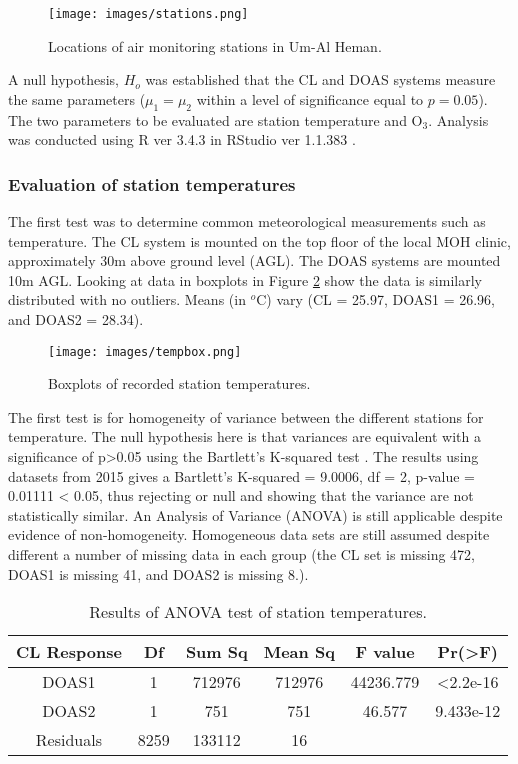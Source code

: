 %
\begin{figure}[H]
\centering
\texttt{[image: images/stations.png]} 
\caption{Locations of air monitoring stations in Um-Al Heman.}
\label{fig:stations}
\end{figure}
%
A null hypothesis, $H_{o}$ was established that the CL and DOAS systems measure the same parameters ($\mu_{1} = \mu_{2}$ within a level of significance equal to $p=0.05$). The two parameters to be evaluated are station temperature and O$_{3}$. Analysis was conducted using R ver 3.4.3 in RStudio ver 1.1.383 \citep{r2013}.

\subsubsection{Evaluation of station temperatures}
 The first test was to determine common meteorological measurements such as temperature.  The CL system is mounted on the top floor of the local MOH clinic, approximately 30m above ground level (AGL). The DOAS systems are mounted 10m AGL. Looking at data in boxplots in Figure \ref{fig:tempbox} show the data is similarly distributed with no outliers. Means (in $^{o}$C)  vary (CL = 25.97, DOAS1 = 26.96, and DOAS2 = 28.34).

%
\begin{figure}[H]
\centering
\texttt{[image: images/tempbox.png]} 
\caption{Boxplots of recorded station temperatures.}
\label{fig:tempbox}
\end{figure}
%

The first test is for homogeneity of variance between the different stations for temperature. The null hypothesis here is that variances are equivalent with a significance of p>0.05 using the Bartlett's K-squared test \citep{Mason2003}. The results using datasets from 2015 gives a Bartlett's K-squared = 9.0006, df = 2, p-value = 0.01111 < 0.05, thus rejecting or null and showing that the variance are not statistically similar. An Analysis of Variance (ANOVA) is still applicable despite evidence of non-homogeneity. Homogeneous data sets are still assumed despite different a number of missing data in each group (the CL set is missing 472, DOAS1 is missing 41, and DOAS2 is missing 8.).

\begin{table}[H]
\centering
\caption{Results of ANOVA test of station temperatures.}
\label{tab:anovatemp}
\begin{tabular}{@{}cccccc@{}}
\toprule
\textbf{CL Response} & \textbf{Df} & \textbf{Sum Sq} & \textbf{Mean Sq} & \textbf{F value} & \textbf{Pr(>F)} \\ \midrule
DOAS1 & 1 & 712976 & 712976 & 44236.779 & \textless 2.2e-16  \\
DOAS2 & 1 & 751 & 751 & 46.577 & 9.433e-12  \\
Residuals & 8259 & 133112 & 16 &  &  \\ \bottomrule
\end{tabular}
\end{table}


